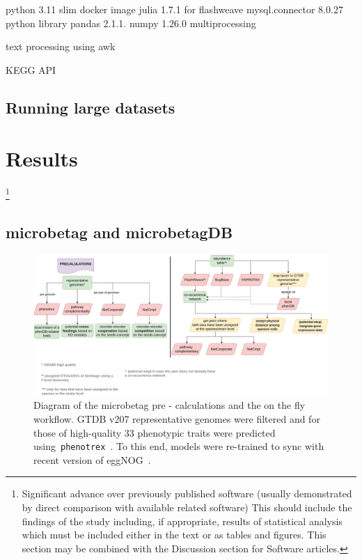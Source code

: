 \documentclass[sn-mathphys,Numbered]{sn-jnl}%
\theoremstyle{thmstyleone}%
\theoremstyle{thmstyletwo}%
\theoremstyle{thmstylethree}%
\begin{document}
        python 3.11 slim docker image 
        julia 1.7.1 for flashweave 
        mysql.connector 8.0.27 python library
        pandas 2.1.1.
        numpy 1.26.0
        multiprocessing

        text processing using awk 

        KEGG API




    \subsection{Running large datasets}






\section{Results}
    \label{sec:results}
    \footnote{
        Significant advance over previously published software (usually demonstrated by direct comparison with available related software)
        This should include the findings of the study including, if appropriate, results of statistical analysis which must be included either in the text or as tables and figures. 
        This section may be combined with the Discussion section for Software articles.
    }

    \subsection*{microbetag and microbetagDB}
        \label{subsec:microbetagdb}


        \begin{figure}[H]
            \label{fig:wf}
            \caption{
                Diagram of the microbetag pre - calculations and the on the fly workflow. 
                GTDB v207 representative genomes were filtered and for those of high-quality
                33 phenotypic traits were predicted using~\texttt{phenotrex}~\cite{feldbauer2015prediction}.
                To this end, models were re-trained to sync with recent version of eggNOG~\cite{huerta2019eggnog}.
            }
            \includegraphics[width=0.9\columnwidth]{figs/microbetag-wf.png}
        \end{figure}
\end{document}
